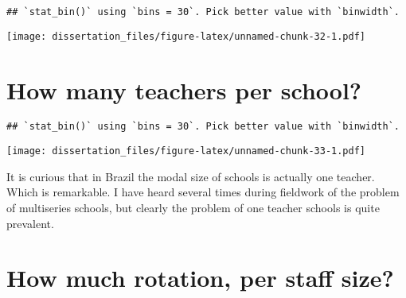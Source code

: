\documentclass[12pt,]{book}
\newenvironment{Shaded}{\begin{snugshade}}{\end{snugshade}}
\newcommand{\DataTypeTok}[1]{\textcolor[rgb]{0.13,0.29,0.53}{#1}}
\newcommand{\DecValTok}[1]{\textcolor[rgb]{0.00,0.00,0.81}{#1}}
\newcommand{\KeywordTok}[1]{\textcolor[rgb]{0.13,0.29,0.53}{\textbf{#1}}}
\newcommand{\NormalTok}[1]{#1}
\newcommand{\OperatorTok}[1]{\textcolor[rgb]{0.81,0.36,0.00}{\textbf{#1}}}
\newcommand{\StringTok}[1]{\textcolor[rgb]{0.31,0.60,0.02}{#1}}
\begin{document}
\begin{verbatim}
## `stat_bin()` using `bins = 30`. Pick better value with `binwidth`.
\end{verbatim}

\texttt{[image: dissertation\_files/figure-latex/unnamed-chunk-32-1.pdf]}

\hypertarget{how-many-teachers-per-school}{%
\chapter{How many teachers per school?}\label{how-many-teachers-per-school}}

\begin{Shaded}
\end{Shaded}

\begin{verbatim}
## `stat_bin()` using `bins = 30`. Pick better value with `binwidth`.
\end{verbatim}

\texttt{[image: dissertation\_files/figure-latex/unnamed-chunk-33-1.pdf]}

It is curious that in Brazil the modal size of schools is actually one teacher. Which is remarkable. I have heard several times during fieldwork of the problem of multiseries schools, but clearly the problem of one teacher schools is quite prevalent.

\hypertarget{how-much-rotation-per-staff-size}{%
\chapter{How much rotation, per staff size?}\label{how-much-rotation-per-staff-size}}

\begin{Shaded}
\end{Shaded}
\end{document}
